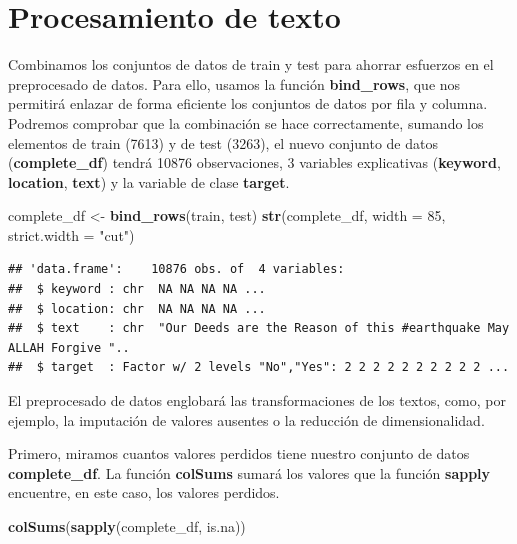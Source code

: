 \documentclass[]{article}
\newenvironment{Shaded}{\begin{snugshade}}{\end{snugshade}}
\newcommand{\DataTypeTok}[1]{\textcolor[rgb]{0.13,0.29,0.53}{#1}}
\newcommand{\DecValTok}[1]{\textcolor[rgb]{0.00,0.00,0.81}{#1}}
\newcommand{\KeywordTok}[1]{\textcolor[rgb]{0.13,0.29,0.53}{\textbf{#1}}}
\newcommand{\NormalTok}[1]{#1}
\newcommand{\StringTok}[1]{\textcolor[rgb]{0.31,0.60,0.02}{#1}}
\begin{document}
\hypertarget{procesamiento-de-texto}{%
\section{Procesamiento de texto}\label{procesamiento-de-texto}}

Combinamos los conjuntos de datos de train y test para ahorrar esfuerzos
en el preprocesado de datos. Para ello, usamos la función
\textbf{bind\_rows}, que nos permitirá enlazar de forma eficiente los
conjuntos de datos por fila y columna. Podremos comprobar que la
combinación se hace correctamente, sumando los elementos de train (7613)
y de test (3263), el nuevo conjunto de datos (\textbf{complete\_df})
tendrá 10876 observaciones, 3 variables explicativas (\textbf{keyword},
\textbf{location}, \textbf{text}) y la variable de clase
\textbf{target}.

\begin{Shaded}
\begin{Highlighting}[]
\NormalTok{complete_df <-}\StringTok{ }\KeywordTok{bind_rows}\NormalTok{(train, test)}
\KeywordTok{str}\NormalTok{(complete_df, }\DataTypeTok{width =} \DecValTok{85}\NormalTok{, }\DataTypeTok{strict.width =} \StringTok{"cut"}\NormalTok{)}
\end{Highlighting}
\end{Shaded}

\begin{verbatim}
## 'data.frame':    10876 obs. of  4 variables:
##  $ keyword : chr  NA NA NA NA ...
##  $ location: chr  NA NA NA NA ...
##  $ text    : chr  "Our Deeds are the Reason of this #earthquake May ALLAH Forgive "..
##  $ target  : Factor w/ 2 levels "No","Yes": 2 2 2 2 2 2 2 2 2 2 ...
\end{verbatim}

El preprocesado de datos englobará las transformaciones de los textos,
como, por ejemplo, la imputación de valores ausentes o la reducción de
dimensionalidad.

Primero, miramos cuantos valores perdidos tiene nuestro conjunto de
datos \textbf{complete\_df}. La función \textbf{colSums} sumará los
valores que la función \textbf{sapply} encuentre, en este caso, los
valores perdidos.

\begin{Shaded}
\begin{Highlighting}[]
\KeywordTok{colSums}\NormalTok{(}\KeywordTok{sapply}\NormalTok{(complete_df, is.na))}
\end{Highlighting}
\end{Shaded}
\end{document}
